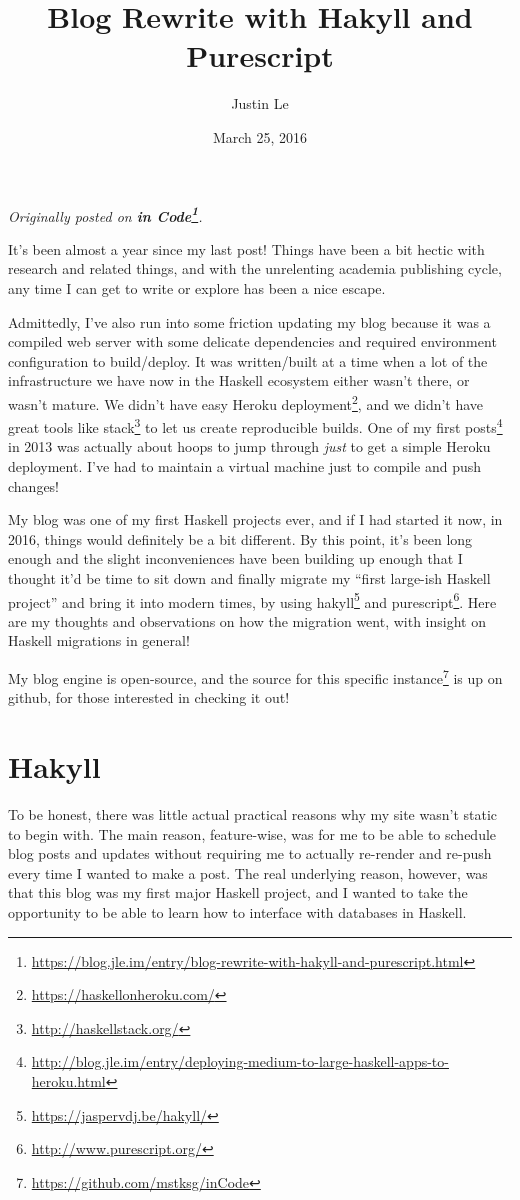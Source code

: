 \documentclass[]{article}
\title{Blog Rewrite with Hakyll and Purescript}
\author{Justin Le}
\date{March 25, 2016}
\renewcommand{\href}[2]{#2\footnote{\url{#1}}}
\begin{document}
\maketitle

\emph{Originally posted on
\textbf{\href{https://blog.jle.im/entry/blog-rewrite-with-hakyll-and-purescript.html}{in
Code}}.}

It's been almost a year since my last post! Things have been a bit hectic with
research and related things, and with the unrelenting academia publishing cycle,
any time I can get to write or explore has been a nice escape.

Admittedly, I've also run into some friction updating my blog because it was a
compiled web server with some delicate dependencies and required environment
configuration to build/deploy. It was written/built at a time when a lot of the
infrastructure we have now in the Haskell ecosystem either wasn't there, or
wasn't mature. We didn't have easy \href{https://haskellonheroku.com/}{Heroku
deployment}, and we didn't have great tools like
\href{http://haskellstack.org/}{stack} to let us create reproducible builds. One
of my
\href{http://blog.jle.im/entry/deploying-medium-to-large-haskell-apps-to-heroku.html}{first
posts} in 2013 was actually about hoops to jump through \emph{just} to get a
simple Heroku deployment. I've had to maintain a virtual machine just to compile
and push changes!

My blog was one of my first Haskell projects ever, and if I had started it now,
in 2016, things would definitely be a bit different. By this point, it's been
long enough and the slight inconveniences have been building up enough that I
thought it'd be time to sit down and finally migrate my ``first large-ish
Haskell project'' and bring it into modern times, by using
\href{https://jaspervdj.be/hakyll/}{hakyll} and
\href{http://www.purescript.org/}{purescript}. Here are my thoughts and
observations on how the migration went, with insight on Haskell migrations in
general!

My blog engine is open-source, and the
\href{https://github.com/mstksg/inCode}{source for this specific instance} is up
on github, for those interested in checking it out!

\section{Hakyll}\label{hakyll}

To be honest, there was little actual practical reasons why my site wasn't
static to begin with. The main reason, feature-wise, was for me to be able to
schedule blog posts and updates without requiring me to actually re-render and
re-push every time I wanted to make a post. The real underlying reason, however,
was that this blog was my first major Haskell project, and I wanted to take the
opportunity to be able to learn how to interface with databases in Haskell.
\end{document}
